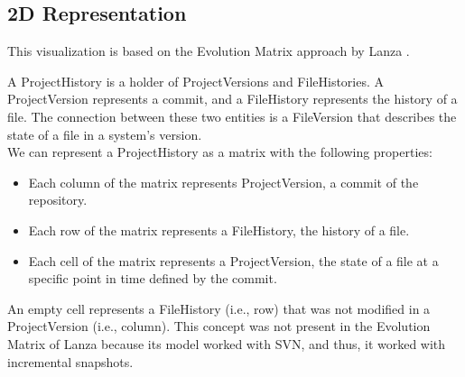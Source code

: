 \subsection{2D Representation}
This visualization is based on the Evolution Matrix approach by Lanza \cite{Lanza2001}. 

A ProjectHistory is a holder of ProjectVersions and FileHistories. 
A ProjectVersion represents a commit, and a FileHistory represents the history of a file. 
The connection between these two entities is a FileVersion that describes the state of a file in a system's version. \\
We can represent a ProjectHistory as a matrix with the following properties: 
\begin{itemize}
    \item Each column of the matrix represents ProjectVersion, a commit of the repository. 
    \item Each row of the matrix represents a FileHistory, the history of a file. 
    \item Each cell of the matrix represents a ProjectVersion, the state of a file at a specific point in time defined by the commit. 
\end{itemize}

An empty cell represents a FileHistory (i.e., row) that was not modified in a ProjectVersion (i.e., column). 
This concept was not present in the Evolution Matrix of Lanza because its model worked with SVN, and thus, it worked with incremental snapshots.  

